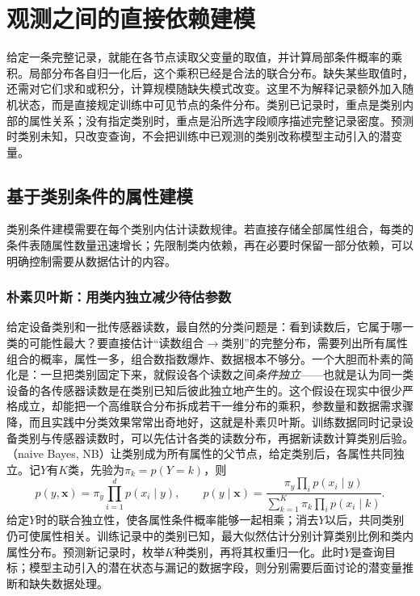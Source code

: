 \section{观测之间的直接依赖建模}
\label{sec:pgm-static-directed-direct}

给定一条完整记录，就能在各节点读取父变量的取值，并计算局部条件概率的乘积。局部分布各自归一化后，这个乘积已经是合法的联合分布。缺失某些取值时，还需对它们求和或积分，计算规模随缺失模式改变。这里不为解释记录额外加入随机状态，而是直接规定训练中可见节点的条件分布。类别已记录时，重点是类别内部的属性关系；没有指定类别时，重点是沿所选字段顺序描述完整记录密度。预测时类别未知，只改变查询，不会把训练中已观测的类别改称模型主动引入的潜变量。

\subsection{基于类别条件的属性建模}
\label{sec:pgm-static-directed-naive-tan}

类别条件建模需要在每个类别内估计读数规律。若直接存储全部属性组合，每类的条件表随属性数量迅速增长；先限制类内依赖，再在必要时保留一部分依赖，可以明确控制需要从数据估计的内容。

\subsubsection{朴素贝叶斯：用类内独立减少待估参数}
\label{sec:pgm-static-directed-naive}

给定设备类别和一批传感器读数，最自然的分类问题是：看到读数后，它属于哪一类的可能性最大？要直接估计“读数组合$\to$类别”的完整分布，需要列出所有属性组合的概率，属性一多，组合数指数爆炸、数据根本不够分。一个大胆而朴素的简化是：一旦把类别固定下来，就假设各个读数之间\emph{条件独立}——也就是认为同一类设备的各传感器读数是在类别已知后彼此独立地产生的。这个假设在现实中很少严格成立，却能把一个高维联合分布拆成若干一维分布的乘积，参数量和数据需求骤降，而且实践中分类效果常常出奇地好，这就是朴素贝叶斯。训练数据同时记录设备类别与传感器读数时，可以先估计各类的读数分布，再据新读数计算类别后验。（naive Bayes, NB）让类别成为所有属性的父节点，给定类别后，各属性共同独立。记$Y$有$K$类，先验为$\pi_k=p(Y=k)$，则
\begin{equation}
  \label{eq:pgm-static-directed-naive}
  p(y,\bm{x})=\pi_y\prod_{i=1}^{d}p(x_i\mid y),\qquad
  p(y\mid\bm{x})=
  \frac{\pi_y\prod_i p(x_i\mid y)}
       {\sum_{k=1}^{K}\pi_k\prod_i p(x_i\mid k)}.
\end{equation}
给定$Y$时的联合独立性，使各属性条件概率能够一起相乘；消去$Y$以后，共同类别仍可使属性相关。训练记录中的类别已知，最大似然估计分别计算类别比例和类内属性分布。预测新记录时，枚举$K$种类别，再将其权重归一化。此时$Y$是查询目标；模型主动引入的潜在状态与漏记的数据字段，则分别需要后面讨论的潜变量推断和缺失数据处理。

